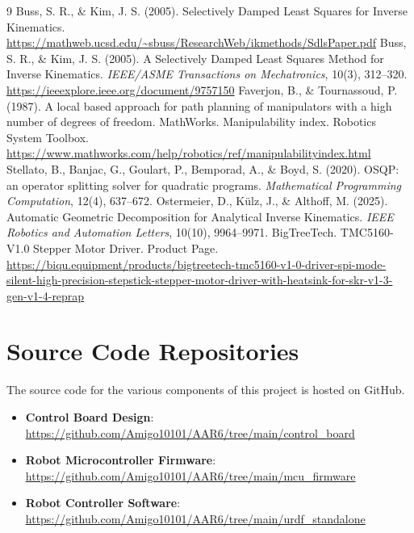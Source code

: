 \documentclass[12pt,a4paper]{report}
\begin{document}
\begin{thebibliography}{9}
     Buss, S. R., \& Kim, J. S. (2005). Selectively Damped Least Squares for Inverse Kinematics. \url{https://mathweb.ucsd.edu/~sbuss/ResearchWeb/ikmethods/SdlsPaper.pdf}
     Buss, S. R., \& Kim, J. S. (2005). A Selectively Damped Least Squares Method for Inverse Kinematics. \textit{IEEE/ASME Transactions on Mechatronics}, 10(3), 312--320. \url{https://ieeexplore.ieee.org/document/9757150}
     Faverjon, B., \& Tournassoud, P. (1987). A local based approach for path planning of manipulators with a high number of degrees of freedom.
     MathWorks. Manipulability index. Robotics System Toolbox. \url{https://www.mathworks.com/help/robotics/ref/manipulabilityindex.html}
     Stellato, B., Banjac, G., Goulart, P., Bemporad, A., \& Boyd, S. (2020). OSQP: an operator splitting solver for quadratic programs. \textit{Mathematical Programming Computation}, 12(4), 637--672.
     Ostermeier, D., Külz, J., \& Althoff, M. (2025). Automatic Geometric Decomposition for Analytical Inverse Kinematics. \textit{IEEE Robotics and Automation Letters}, 10(10), 9964--9971.
     BigTreeTech. TMC5160-V1.0 Stepper Motor Driver. Product Page. \url{https://biqu.equipment/products/bigtreetech-tmc5160-v1-0-driver-spi-mode-silent-high-precision-stepstick-stepper-motor-driver-with-heatsink-for-skr-v1-3-gen-v1-4-reprap}
\end{thebibliography}


\appendix

\chapter{Source Code Repositories}
The source code for the various components of this project is hosted on GitHub.
\begin{itemize}
    \item \textbf{Control Board Design}: \url{https://github.com/Amigo10101/AAR6/tree/main/control_board}
    \item \textbf{Robot Microcontroller Firmware}: \url{https://github.com/Amigo10101/AAR6/tree/main/mcu_firmware}
    \item \textbf{Robot Controller Software}: \url{https://github.com/Amigo10101/AAR6/tree/main/urdf_standalone}
\end{itemize}
\end{document}
